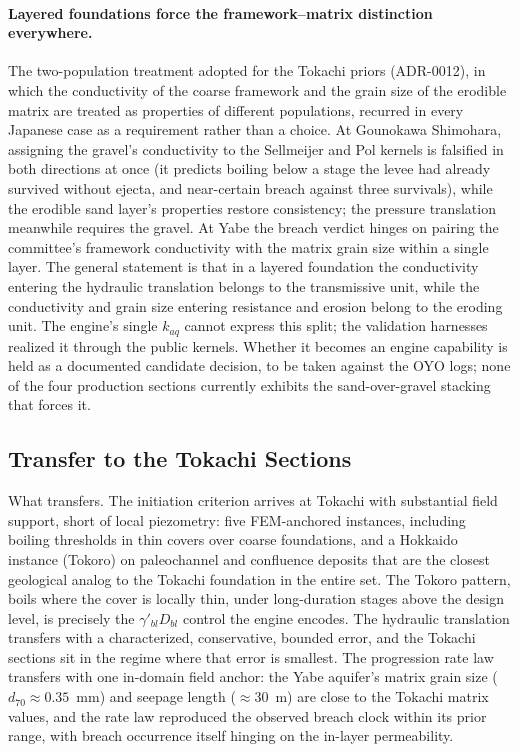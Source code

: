 \paragraph{Layered foundations force the framework--matrix distinction
everywhere.} The two-population treatment adopted for the Tokachi priors
(ADR-0012), in which the conductivity of the coarse framework and the grain
size of the erodible matrix are treated as properties of different
populations, recurred in every Japanese case as a requirement rather than a
choice. At Gounokawa Shimohara, assigning the gravel's conductivity to the
Sellmeijer and Pol kernels is falsified in both directions at once (it
predicts boiling below a stage the levee had already survived without
ejecta, and near-certain breach against three survivals), while the
erodible sand layer's properties restore consistency; the pressure
translation meanwhile requires the gravel. At Yabe the breach verdict
hinges on pairing the committee's framework conductivity with the
matrix grain size within a single layer. The general statement is that in a
layered foundation the conductivity entering the hydraulic translation
belongs to the transmissive unit, while the conductivity and grain size
entering resistance and erosion belong to the eroding unit. The engine's
single $k_{aq}$ cannot express this split; the validation harnesses realized
it through the public kernels. Whether it becomes an engine capability is
held as a documented candidate decision, to be taken against the OYO logs;
none of the four production sections currently exhibits the
sand-over-gravel stacking that forces it.

\subsection{Transfer to the Tokachi Sections}
\label{subsec: Transfer to the Tokachi Sections}

What transfers. The initiation criterion arrives at Tokachi with
substantial field support, short of local piezometry: five FEM-anchored
instances, including boiling thresholds in thin covers over coarse
foundations, and a Hokkaido instance (Tokoro) on paleochannel and
confluence deposits that are the closest geological analog to the Tokachi
foundation in the entire set. The Tokoro pattern, boils where the cover is
locally thin, under long-duration stages above the design level, is
precisely the $\gamma'_{bl} D_{bl}$ control the engine encodes. The
hydraulic translation transfers with a characterized, conservative,
bounded error, and the Tokachi sections sit in the regime where that error
is smallest. The progression rate law transfers with one in-domain field
anchor: the Yabe aquifer's matrix grain size ($d_{70} \approx 0.35$~mm) and
seepage length ($\approx 30$~m) are close to the Tokachi matrix values, and
the rate law reproduced the observed breach clock within its prior range,
with breach occurrence itself hinging on the in-layer permeability.

